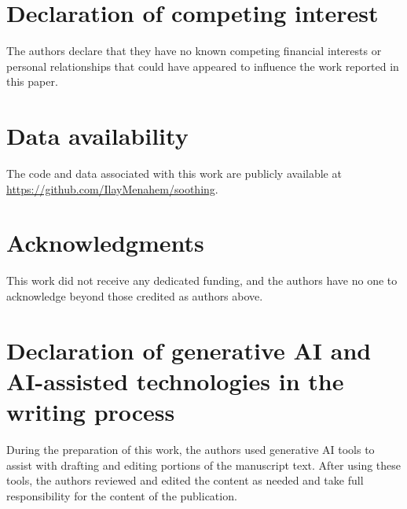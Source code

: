 \section*{Declaration of competing interest}
The authors declare that they have no known competing financial
interests or personal relationships that could have appeared to
influence the work reported in this paper.

\section*{Data availability}
The code and data associated with this work are publicly available at
\url{https://github.com/IlayMenahem/soothing}.

\section*{Acknowledgments}
This work did not receive any dedicated funding, and the authors have
no one to acknowledge beyond those credited as authors above.

\section*{Declaration of generative AI and AI-assisted technologies
in the writing process}
During the preparation of this work, the authors used generative AI
tools to assist with drafting and editing portions of the manuscript
text. After using these tools, the authors reviewed and edited the
content as needed and take full responsibility for the content of the
publication.
